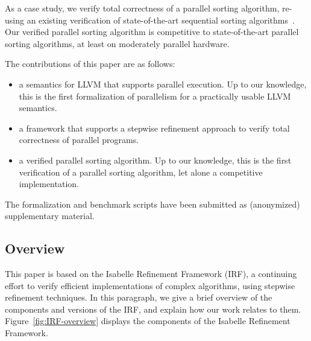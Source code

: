 \documentclass[runningheads]{llncs}
\begin{document}
As a case study, we verify total correctness of a parallel sorting algorithm,
re-using an existing verification of state-of-the-art sequential sorting algorithms~\cite{La20}.
Our verified parallel sorting algorithm is competitive to state-of-the-art parallel sorting algorithms,
at least on moderately parallel hardware.




The contributions of this paper are as follows:
\begin{itemize}
  \item a semantics for LLVM that supports parallel execution.
    Up to our knowledge, this is the first formalization of parallelism for a practically usable LLVM semantics.

  \item a framework that supports a stepwise refinement approach to verify total correctness of parallel programs.

  \item a verified parallel sorting algorithm. Up to our knowledge, this is the
    first verification of a parallel sorting algorithm, let alone a competitive implementation.

\end{itemize}

The formalization and benchmark scripts have been submitted as (anonymized) supplementary material.


\subsection{Overview}\label{sec:intro_overview}
This paper is based on the Isabelle Refinement Framework (IRF), a continuing effort
to verify efficient implementations of complex algorithms, using stepwise refinement techniques.
In this paragraph, we give a brief overview of the components and versions of the IRF,
and explain how our work relates to them.
Figure~\ref{fig:IRF-overview} displays the components of the Isabelle Refinement Framework.
\end{document}
